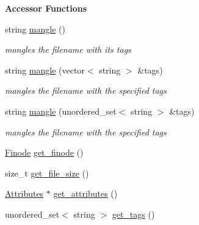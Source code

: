 \begin{Indent}\textbf{ Accessor Functions}\par
\begin{DoxyCompactItemize}
\item 
string \mbox{\hyperlink{classFileInfo_a96827c2e48fb1a15d468e9afd545383e}{mangle}} ()
\begin{DoxyCompactList}\small\item\em mangles the filename with its tags \end{DoxyCompactList}\item 
string \mbox{\hyperlink{classFileInfo_a105ad751f21bead6fc2a76e79cb3b701}{mangle}} (vector$<$ string $>$ \&tags)
\begin{DoxyCompactList}\small\item\em mangles the filename with the specified tags \end{DoxyCompactList}\item 
string \mbox{\hyperlink{classFileInfo_aec8a60addbed54097f6cac0a6a516717}{mangle}} (unordered\+\_\+set$<$ string $>$ \&tags)
\begin{DoxyCompactList}\small\item\em mangles the filename with the specified tags \end{DoxyCompactList}\item 
\mbox{\hyperlink{structfinode}{Finode}} \mbox{\hyperlink{classFileInfo_a706117270bcf31739d7ce0aa0d79891f}{get\+\_\+finode}} ()
\item 
size\+\_\+t \mbox{\hyperlink{classFileInfo_aa07a5b95bfd41814b7fb2ee30a279c65}{get\+\_\+file\+\_\+size}} ()
\item 
\mbox{\hyperlink{classAttributes}{Attributes}} $\ast$ \mbox{\hyperlink{classFileInfo_a07f09582ef3c3beb105906d5c71234a5}{get\+\_\+attributes}} ()
\item 
unordered\+\_\+set$<$ string $>$ \mbox{\hyperlink{classFileInfo_a63d01334c1c2ae22e5d1930afa5c74d4}{get\+\_\+tags}} ()
\end{DoxyCompactItemize}
\end{Indent}
